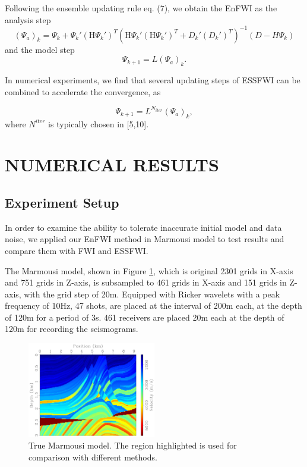 \documentclass[mreferee]{gji}
\begin{document}
Following the ensemble updating rule eq. (7), we obtain the EnFWI as the analysis step
\begin{equation}
(\Psi_a)_k=\Psi_k+\Psi_k'(\mbox{H}\Psi_k')^T\left(\mbox{H}\Psi_k'(\mbox{H}\Psi_k')^T+D_k'(D_k')^T\right)^{-1}(D-H\Psi_k)
\end{equation}
and the model step
\begin{equation}
\Psi_{k+1}=L(\Psi_a)_k.
\end{equation}

In numerical experiments, we find that several updating steps of ESSFWI can be combined to accelerate the convergence, as

\begin{equation}
\Psi_{k+1}=L^{N_{iter}}(\Psi_a)_k,
\end{equation}
where $N^{iter}$ is typically chosen in [5,10].

\section{NUMERICAL RESULTS}
\subsection{Experiment Setup}
In order to examine the ability to tolerate inaccurate initial model and data noise, we applied our EnFWI method in Marmousi model to test results and compare them with FWI and ESSFWI.

The Marmousi model, shown in Figure \ref{fig:marmousi}, which is original 2301 grids in X-axis and 751 grids in Z-axis, is subsampled to 461 grids in X-axis and 151 grids in Z-axis, with the grid step of 20m. Equipped with Ricker wavelets with a peak frequency of 10Hz, 47 shots, are placed at the interval of 200m each, at the depth of 120m for a period of 3s. 461 receivers are placed 20m each at the depth of 120m for recording the seismograms.

\begin{figure}
\center
\includegraphics[width=0.5\textwidth]{fig/marmvel.pdf}
\caption{True Marmousi model. The region highlighted is used for comparison with different methods.}
\label{fig:marmousi}
\end{figure}
\end{document}
